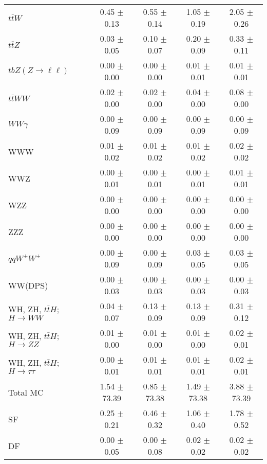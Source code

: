 \begin{tabular}{l|cccc}
                   $t\overline{t}W$ &  0.45 $\pm$  0.13 &  0.55 $\pm$  0.14 &  1.05 $\pm$  0.19 &  2.05 $\pm$  0.26 \\
                   $t\overline{t}Z$ &  0.03 $\pm$  0.05 &  0.10 $\pm$  0.07 &  0.20 $\pm$  0.09 &  0.33 $\pm$  0.11 \\
    $tbZ (Z \rightarrow \ell \ell)$ &  0.00 $\pm$  0.00 &  0.00 $\pm$  0.00 &  0.01 $\pm$  0.01 &  0.01 $\pm$  0.01 \\
                  $t\overline{t}WW$ &  0.02 $\pm$  0.00 &  0.02 $\pm$  0.00 &  0.04 $\pm$  0.00 &  0.08 $\pm$  0.00 \\
                         $WW\gamma$ &  0.00 $\pm$  0.09 &  0.00 $\pm$  0.09 &  0.00 $\pm$  0.09 &  0.00 $\pm$  0.09 \\
                                WWW &  0.01 $\pm$  0.02 &  0.01 $\pm$  0.02 &  0.01 $\pm$  0.02 &  0.02 $\pm$  0.02 \\
                                WWZ &  0.00 $\pm$  0.01 &  0.00 $\pm$  0.01 &  0.00 $\pm$  0.01 &  0.01 $\pm$  0.01 \\
                                WZZ &  0.00 $\pm$  0.00 &  0.00 $\pm$  0.00 &  0.00 $\pm$  0.00 &  0.00 $\pm$  0.00 \\
                                ZZZ &  0.00 $\pm$  0.00 &  0.00 $\pm$  0.00 &  0.00 $\pm$  0.00 &  0.00 $\pm$  0.00 \\
                 $qqW^{\pm}W^{\pm}$ &  0.00 $\pm$  0.09 &  0.00 $\pm$  0.09 &  0.03 $\pm$  0.05 &  0.03 $\pm$  0.05 \\
                            WW(DPS) &  0.00 $\pm$  0.03 &  0.00 $\pm$  0.03 &  0.00 $\pm$  0.03 &  0.00 $\pm$  0.03 \\
WH, ZH, $t\bar{t}H$; $H \rightarrow WW$ &  0.04 $\pm$  0.07 &  0.13 $\pm$  0.09 &  0.13 $\pm$  0.09 &  0.31 $\pm$  0.12 \\
WH, ZH, $t\bar{t}H$; $H \rightarrow ZZ$ &  0.01 $\pm$  0.00 &  0.01 $\pm$  0.00 &  0.01 $\pm$  0.00 &  0.02 $\pm$  0.01 \\
WH, ZH, $t\bar{t}H$; $H \rightarrow \tau\tau$ &  0.00 $\pm$  0.01 &  0.01 $\pm$  0.01 &  0.01 $\pm$  0.01 &  0.02 $\pm$  0.01 \\
\hline\hline
                           Total MC &  1.54 $\pm$ 73.39 &  0.85 $\pm$ 73.38 &  1.49 $\pm$ 73.38 &  3.88 $\pm$ 73.39 \\
\hline
                                 SF &  0.25 $\pm$  0.21 &  0.46 $\pm$  0.32 &  1.06 $\pm$  0.40 &  1.78 $\pm$  0.52 \\
                                 DF &  0.00 $\pm$  0.05 &  0.00 $\pm$  0.08 &  0.02 $\pm$  0.02 &  0.02 $\pm$  0.02 \\

\end{tabular}
